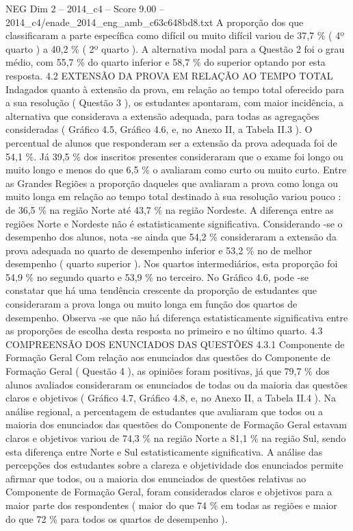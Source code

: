\begin{textsample}{NEG Dim 2 – 2014\_c4 – Score 9.00 – 2014\_c4/enade\_2014\_eng\_amb\_c63c648bd8.txt}
A proporção dos que classificaram a parte específica como difícil ou muito difícil variou de 37,7 \% ( 4º quarto ) a 40,2 \% ( 2º quarto ).
A alternativa modal para a Questão 2 foi o grau médio, com 55,7 \% do quarto inferior e 58,7 \% do superior optando por esta resposta. 4.2 EXTENSÃO DA PROVA EM RELAÇÃO AO TEMPO TOTAL Indagados quanto à extensão da prova, em relação ao tempo total oferecido para a sua resolução ( Questão 3 ), os estudantes apontaram, com maior incidência, a alternativa que considerava a extensão adequada, para todas as agregações consideradas ( Gráfico 4.5, Gráfico 4.6, e, no Anexo II, a Tabela II.3 ).
O percentual de alunos que responderam ser a extensão da prova adequada foi de 54,1 \%.
Já 39,5 \% dos inscritos presentes consideraram que o exame foi longo ou muito longo e menos do que 6,5 \% o avaliaram como curto ou muito curto.
Entre as Grandes Regiões a proporção daqueles que avaliaram a prova como longa ou muito longa em relação ao tempo total destinado à sua resolução variou pouco : de 36,5 \% na região Norte até 43,7 \% na região Nordeste.
A diferença entre as regiões Norte e Nordeste não é estatisticamente significativa.
Considerando -se o desempenho dos alunos, nota -se ainda que 54,2 \% consideraram a extensão da prova adequada no quarto de desempenho inferior e 53,2 \% no de melhor desempenho ( quarto superior ).
Nos quartos intermediários, esta proporção foi 54,9 \% no segundo quarto e 53,9 \% no terceiro.
No Gráfico 4.6, pode -se constatar que há uma tendência crescente da proporção de estudantes que consideraram a prova longa ou muito longa em função dos quartos de desempenho.
Observa -se que não há diferença estatisticamente significativa entre as proporções de escolha desta resposta no primeiro e no último quarto. 4.3 COMPREENSÃO DOS ENUNCIADOS DAS QUESTÕES 4.3.1 Componente de Formação Geral Com relação aos enunciados das questões do Componente de Formação Geral ( Questão 4 ), as opiniões foram positivas, já que 79,7 \% dos alunos avaliados consideraram os enunciados de todas ou da maioria das questões claros e objetivos ( Gráfico 4.7, Gráfico 4.8, e, no Anexo II, a Tabela II.4 ).
Na análise regional, a percentagem de estudantes que avaliaram que todos ou a maioria dos enunciados das questões do Componente de Formação Geral estavam claros e objetivos variou de 74,3 \% na região Norte a 81,1 \% na região Sul, sendo esta diferença entre Norte e Sul estatisticamente significativa.
A análise das percepções dos estudantes sobre a clareza e objetividade dos enunciados permite afirmar que todos, ou a maioria dos enunciados de questões relativas ao Componente de Formação Geral, foram considerados claros e objetivos para a maior parte dos respondentes ( maior do que 74 \% em todas as regiões e maior do que 72 \% para todos os quartos de desempenho ).

\end{textsample}

